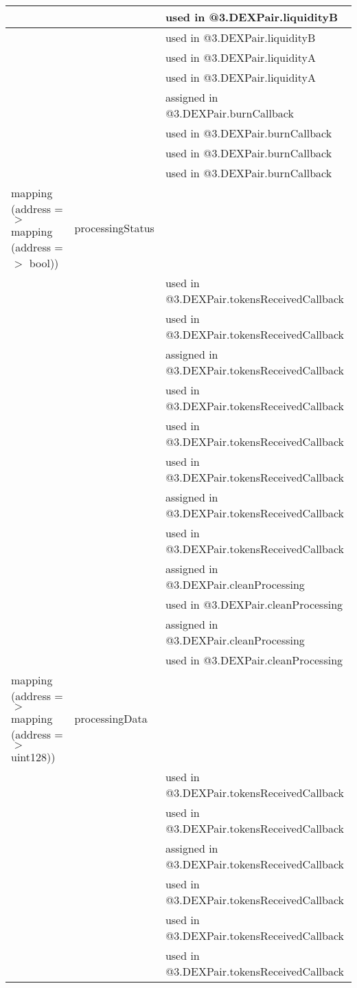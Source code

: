 \begin{tabular}{|l|l|p{5cm}|}
 & & used in @3.DEXPair.liquidityB\\\hline
 & & used in @3.DEXPair.liquidityB\\\hline
 & & used in @3.DEXPair.liquidityA\\\hline
 & & used in @3.DEXPair.liquidityA\\\hline
 & & assigned in @3.DEXPair.burnCallback\\\hline
 & & used in @3.DEXPair.burnCallback\\\hline
 & & used in @3.DEXPair.burnCallback\\\hline
 & & used in @3.DEXPair.burnCallback\\\hline
mapping (address =$>$ mapping (address =$>$ bool)) & processingStatus &  \\\hline
 & & used in @3.DEXPair.tokensReceivedCallback\\\hline
 & & used in @3.DEXPair.tokensReceivedCallback\\\hline
 & & assigned in @3.DEXPair.tokensReceivedCallback\\\hline
 & & used in @3.DEXPair.tokensReceivedCallback\\\hline
 & & used in @3.DEXPair.tokensReceivedCallback\\\hline
 & & used in @3.DEXPair.tokensReceivedCallback\\\hline
 & & assigned in @3.DEXPair.tokensReceivedCallback\\\hline
 & & used in @3.DEXPair.tokensReceivedCallback\\\hline
 & & assigned in @3.DEXPair.cleanProcessing\\\hline
 & & used in @3.DEXPair.cleanProcessing\\\hline
 & & assigned in @3.DEXPair.cleanProcessing\\\hline
 & & used in @3.DEXPair.cleanProcessing\\\hline
mapping (address =$>$ mapping (address =$>$ uint128)) & processingData &  \\\hline
 & & used in @3.DEXPair.tokensReceivedCallback\\\hline
 & & used in @3.DEXPair.tokensReceivedCallback\\\hline
 & & assigned in @3.DEXPair.tokensReceivedCallback\\\hline
 & & used in @3.DEXPair.tokensReceivedCallback\\\hline
 & & used in @3.DEXPair.tokensReceivedCallback\\\hline
 & & used in @3.DEXPair.tokensReceivedCallback\\\hline

\end{tabular}

